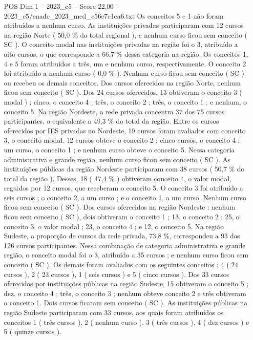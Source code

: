 \begin{textsample}{POS Dim 1 – 2023\_c5 – Score 22.00 – 2023\_c5/enade\_2023\_med\_c56e7c1ea6.txt}
Os conceitos 5 e 1 não foram atribuídos a nenhum curso.
As instituições privadas participaram com 12 cursos na região Norte ( 50,0 \% do total regional ), e nenhum curso ficou sem conceito ( SC ).
O conceito modal nas instituições privadas na região foi o 3, atribuído a oito cursos, o que corresponde a 66,7 \% dessa categoria na região.
Os conceitos 1, 4 e 5 foram atribuídos a três, um e nenhum curso, respectivamente.
O conceito 2 foi atribuído a nenhum curso ( 0,0 \% ).
Nenhum curso ficou sem conceito ( SC ) ou recebeu os demais conceitos.
Dos cursos oferecidos na região Norte, nenhum ficou sem conceito ( SC ).
Dos 24 cursos oferecidos, 13 obtiveram o conceito 3 ( modal ) ; cinco, o conceito 4 ; três, o conceito 2 ; três, o conceito 1 ; e nenhum, o conceito 5.
Na região Nordeste, a rede privada concentra 37 dos 75 cursos participantes, o equivalente a 49,3 \% do total da região.
Entre os cursos oferecidos por IES privadas no Nordeste, 19 cursos foram avaliados com conceito 3, o conceito modal. 12 cursos obteve o conceito 2 ; cinco cursos, o conceito 4 ; um curso, o conceito 1 ; e nenhum curso obteve o conceito 5.
Nessa categoria administrativa e grande região, nenhum curso ficou sem conceito ( SC ).
As instituições públicas da região Nordeste participaram com 38 cursos ( 50,7 \% do total da região ).
Desses, 18 ( 47,4 \% ) obtiveram conceito 4, o valor modal, seguidos por 12 cursos, que receberam o conceito 5.
O conceito 3 foi atribuído a seis cursos ; o conceito 2, a um curso ; e o conceito 1, a um curso.
Nenhum curso ficou sem conceito ( SC ).
Dos cursos oferecidos na região Nordeste : nenhum ficou sem conceito ( SC ), dois obtiveram o conceito 1 ; 13, o conceito 2 ; 25, o conceito 3, o valor modal ; 23, o conceito 4 ; e 12, o conceito 5.
Na região Sudeste, a proporção de cursos da rede privada, 73,8 \%, correspondeu a 93 dos 126 cursos participantes.
Nessa combinação de categoria administrativa e grande região, o conceito modal foi o 3, atribuído a 35 cursos ; e nenhum curso ficou sem conceito ( SC ).
Os demais foram avaliados com os seguintes conceitos : 4 ( 24 cursos ), 2 ( 23 cursos ), 1 ( seis cursos ) e 5 ( cinco cursos ).
Dos 33 cursos oferecidos por instituições públicas na região Sudeste, 15 obtiveram o conceito 5 ; dez, o conceito 4 ; três, o conceito 3 ; nenhum obteve conceito 2 e três obtiveram o conceito 1.
Dois cursos ficaram sem conceito ( SC ).
As instituições públicas na região Sudeste participaram com 33 cursos, aos quais foram atribuídos os conceitos 1 ( três cursos ), 2 ( nenhum curso ), 3 ( três cursos ), 4 ( dez cursos ) e 5 ( quinze cursos ).

\end{textsample}
